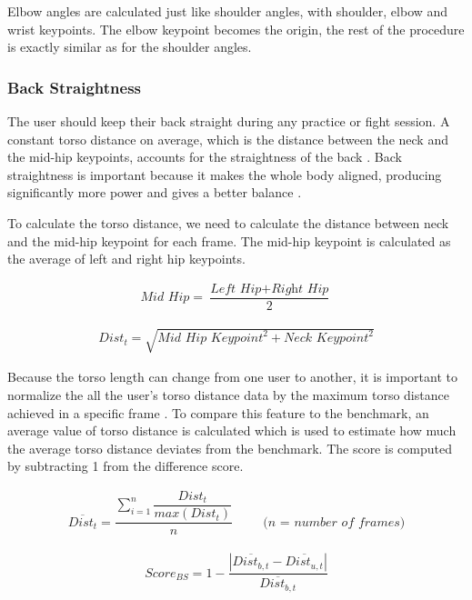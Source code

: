 Elbow angles are calculated just like shoulder angles, with shoulder, elbow and wrist keypoints. The elbow keypoint becomes the origin, the rest of the procedure is exactly similar as for the shoulder angles.

\subsubsection{Back Straightness}
The user should keep their back straight during any practice or fight session. A constant torso distance on average, which is the distance between the neck and the mid-hip keypoints, accounts for the straightness of the back \cite{movementQuality}. Back straightness is important because it makes the whole body aligned, producing significantly more power and gives a better balance \cite{movementQuality}. 

To calculate the torso distance, we need to calculate the distance between neck and the mid-hip keypoint for each frame. The mid-hip keypoint is calculated as the average of left and right hip keypoints. 

\begin{gather}
  \textit{Mid Hip} = \dfrac{\textit{Left Hip} + \textit{Right Hip}}{2}
  \label{eq:midhip}
\end{gather}

\begin{gather}
  Dist_t = \sqrt{\textit{Mid Hip Keypoint}^2 + \textit{Neck Keypoint}^2}
  \label{eq:torsoDistance}
\end{gather}

Because the torso length can change from one user to another, it is important to normalize the all the user's torso distance data by the maximum torso distance achieved in a specific frame \cite{movementQuality}. To compare this feature to the benchmark, an average value of torso distance is calculated which is used to estimate how much the average torso distance deviates from the benchmark. The score is computed by subtracting 1 from the difference score. 

\begin{gather}
  \overline{Dist_t} = \dfrac{ \sum_{i=1}^n \dfrac{Dist_t}{max(Dist_t)}}{n} \hspace{1cm} \textit{(n = number of frames)}
  \label{eq:avgTorsoDist}
\end{gather}

\begin{gather}
  Score_{BS} = 1 - \dfrac{|\overline{Dist_{b,t}} - \overline{Dist_{u,t}}|} { \overline{Dist_{b,t}}}
  \label{eq:torsoScore}
\end{gather}

